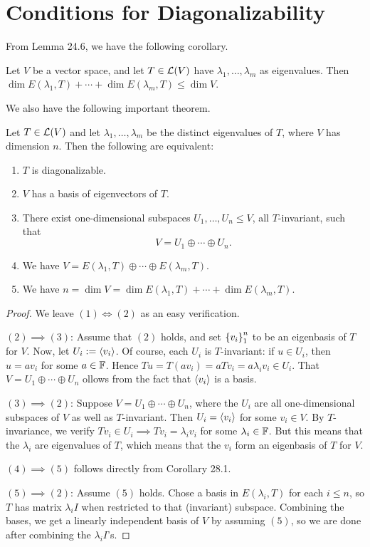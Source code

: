 \documentclass{article}
\begin{document}
\section{Conditions for Diagonalizability}
From Lemma 24.6, we have the following corollary.
\begin{corollary}
Let $V$ be a vector space, and let $T\in\mathcal L(V)$ have $\lambda_1,\ldots, \lambda_m$ as eigenvalues. Then $\dim E(\lambda_1, T) + \cdots + \dim E(\lambda_m, T) \leq \dim V$.
\end{corollary}
We also have the following important theorem.
\newpage
\begin{theorem}
Let $T\in\mathcal L(V)$ and let $\lambda_1, \ldots, \lambda_m$ be the distinct eigenvalues of $T$, where $V$ has dimension $n$. Then the following are equivalent:
\begin{enumerate}
    \item $T$ is diagonalizable.
    \item $V$ has a basis of eigenvectors of $T$.
    \item There exist one-dimensional subspaces $U_1, \ldots, U_n\leq V$, all $T$-invariant, such that $$V = U_1 \oplus \cdots \oplus U_n.$$
    \item We have $V = E(\lambda_1, T)\oplus \cdots \oplus E(\lambda_m, T)$.
    \item We have $n=\dim V = \dim E(\lambda_1, T) +\cdots  + \dim E(\lambda_m, T)$.
\end{enumerate}
\end{theorem}
\begin{proof}
We leave $(1)\iff (2)$ as an easy verification.

$(2)\implies (3)$: Assume that $(2)$ holds, and set $\left\{v_i\right\}_1^n$ to be an eigenbasis of $T$ for $V$. Now, let $U_i := \left\langle v_i\right\rangle$. Of course, each $U_i$ is $T$-invariant: if $u\in U_i$, then $u=av_i$ for some $a\in\mathbb F$. Hence $Tu = T(av_i) = aTv_i = a\lambda_i v_i\in U_i$. That $V = U_1\oplus \cdots \oplus U_n$ ollows from the fact that $\left\langle v_i\right\rangle$ is a basis.

$(3)\implies (2)$: Suppose $V = U_1 \oplus \cdots \oplus U_n$, where the $U_i$ are all one-dimensional subspaces of $V$ as well as $T$-invariant. Then $U_i = \left\langle v_i\right\rangle$ for some $v_i\in V$. By $T$-invariance, we verify $Tv_i \in U_i \implies Tv_i = \lambda_i v_i$ for some $\lambda_i\in\mathbb F$. But this means that the $\lambda_i$ are eigenvalues of $T$, which means that the $v_i$ form an eigenbasis of $T$ for $V$.

$(4)\implies (5)$ follows directly from Corollary 28.1.

$(5)\implies (2)$: Assume $(5)$ holds. Chose a basis in $E(\lambda_i, T)$ for each $i\leq n$, so $T$ has matrix $\lambda_i I$ when restricted to that (invariant) subspace. Combining the bases, we get a linearly independent basis of $V$ by assuming $(5)$, so we are done after combining the $\lambda_iI$'s.
\end{proof}
\end{document}
